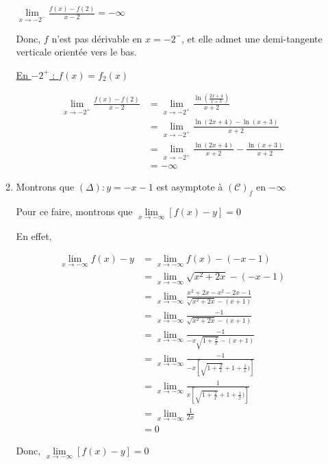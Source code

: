 \documentclass[12pt,a4paper]{article}
\begin{document}
\begin{enumerate}
\begin{enumerate}
\( \lim\limits_{x \to -2^-} \frac{f(x) - f(2)}{x - 2} = -\infty \)


Donc, \( f \) n'est pas dérivable en \( x = -2^- \), et elle admet une demi-tangente verticale orientée vers le bas.

\underline{ En $-2^{+}$ : $f(x) = f_2(x)$ }

\begin{align*}
    \lim_{x \to -2^+} \frac{f(x) - f(2)}{x - 2}& = \lim_{x \to -2^+} \frac{\ln\left(\frac{2x+4}{x+3}\right)}{x+2}\\ 
        &=\lim_{x \to -2^+}  \frac{\ln(2x+4)-\ln(x+3)}{x+2}\\ 
        &=\lim_{x \to -2^+} \frac{\ln(2x+4)}{x+2}-\frac{\ln(x+3)}{x+2}\\ 
        &=-\infty
\end{align*}
\item Montrons que \( ( \Delta ) : y = -x - 1 \) est asymptote à \( ( \mathcal{C} )_{f}\) en \( -\infty \)

Pour ce faire, montrons que \( \lim\limits_{x \to -\infty} \left[ f(x) - y \right] = 0\)

En effet,

\begin{align*}
    \lim_{x \to -\infty} f(x) - y &= \lim_{x \to -\infty} f(x) - (-x - 1)\\
                                  &= \lim_{x \to -\infty} \sqrt{x^{2}+2x} - (-x-1)\\
                                  &= \lim_{x \to -\infty} \frac{x^2 + 2x - x^2 - 2x - 1}{\sqrt{x^2 + 2x} - (x + 1)}\\
                                  &= \lim_{x \to -\infty} \frac{-1}{\sqrt{x^2 + 2x} - (x + 1)}\\
                                  &= \lim_{x \to -\infty} \frac{-1}{-x \sqrt{1 + \frac{2}{x}} - (x + 1)}\\
                                  &= \lim_{x \to -\infty} \frac{-1}{-x \left[\sqrt{1 + \frac{2}{x}} + 1 + \frac{1}{x})\right]}\\
                                  &= \lim_{x \to -\infty} \frac{1}{x \left[\sqrt{1 + \frac{2}{x}} + 1 + \frac{1}{x})\right]}\\
                                  &= \lim_{x \to -\infty} \frac{1}{2x}\\
                                  &=0
\end{align*}

Donc, \( \lim\limits_{x \to -\infty} \left[ f(x) - y \right] = 0 \)


\end{enumerate}
\end{enumerate}
\end{document}
